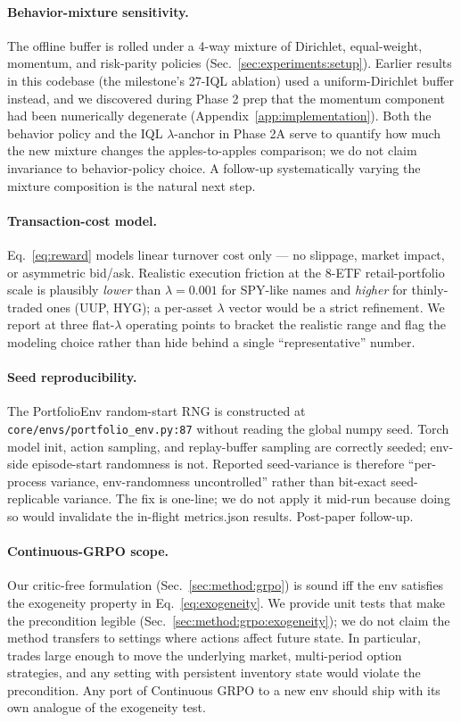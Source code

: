 \paragraph{Behavior-mixture sensitivity.} The offline buffer is rolled
under a 4-way mixture of Dirichlet, equal-weight, momentum, and
risk-parity policies (Sec.~\ref{sec:experiments:setup}). Earlier
results in this codebase (the milestone's 27-IQL ablation) used a
uniform-Dirichlet buffer instead, and we discovered during Phase 2 prep
that the momentum component had been numerically degenerate
(Appendix~\ref{app:implementation}). Both the
behavior policy and the IQL $\lambda$-anchor in Phase 2A serve to
quantify how much the new mixture changes the apples-to-apples
comparison; we do not claim invariance to behavior-policy choice. A
follow-up systematically varying the mixture composition is the natural
next step.

\paragraph{Transaction-cost model.} Eq.~\ref{eq:reward} models linear
turnover cost only --- no slippage, market impact, or asymmetric
bid/ask. Realistic execution friction at the 8-ETF retail-portfolio
scale is plausibly \emph{lower} than $\lambda{=}0.001$ for SPY-like
names and \emph{higher} for thinly-traded ones (UUP, HYG); a per-asset
$\lambda$ vector would be a strict refinement. We report at three
flat-$\lambda$ operating points to bracket the realistic range and flag
the modeling choice rather than hide behind a single ``representative''
number.

\paragraph{Seed reproducibility.} The PortfolioEnv random-start RNG is
constructed at \texttt{core/envs/portfolio\_env.py:87} without reading
the global numpy seed. Torch model init, action sampling, and
replay-buffer sampling are correctly seeded; env-side episode-start
randomness is not. Reported seed-variance is therefore ``per-process
variance, env-randomness uncontrolled'' rather than bit-exact
seed-replicable variance. The fix is one-line; we do not apply it
mid-run because doing so would invalidate the in-flight metrics.json
results. Post-paper follow-up.

\paragraph{Continuous-GRPO scope.} Our critic-free formulation
(Sec.~\ref{sec:method:grpo}) is sound iff the env satisfies the
exogeneity property in Eq.~\ref{eq:exogeneity}. We provide unit tests
that make the precondition legible
(Sec.~\ref{sec:method:grpo:exogeneity}); we do not claim the method
transfers to settings where actions affect future state. In particular,
trades large enough to move the underlying market, multi-period option
strategies, and any setting with persistent inventory state would
violate the precondition. Any port of Continuous GRPO to a new env
should ship with its own analogue of the exogeneity test.

